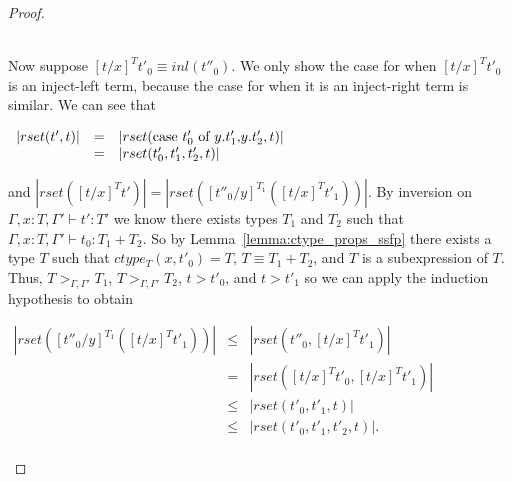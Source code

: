 \begin{proof}
\begin{itemize}
  \ \\
  Now suppose $[t/x]^T t'_0 \equiv inl(t''_0)$.  We only show the case for when $[t/x]^T t'_0$ is an inject-left
  term, because the case for when it is an inject-right term is similar.  We can see that 
  \begin{center}
    \begin{math}
      \begin{array}{lll}
        |rset(t',t)| & = & |rset(\mbox{case}\ t'_0\ \text{of}\ y\text{.}t'_1\text{,}y\text{.}t'_2,t)|\\
        & = & |rset(t'_0,t'_1,t'_2,t)|
      \end{array}
    \end{math}
  \end{center}
  and $|rset([t/x]^T t')| = |rset([t''_0/y]^{T_1} ([t/x]^T t'_1))|$.    By inversion on $\Gamma,x:T,\Gamma' \vdash t':T'$ we know there exists
  types $T_1$ and $T_2$ such that $\Gamma,x:T,\Gamma' \vdash t_0:T_1+T_2$.
  So by Lemma~\ref{lemma:ctype_props_ssfp} there exists a type $T$ such that $ctype_T (x,t'_0) = T$, $T \equiv T_1+T_2$, and $T$ is a 
  subexpression of $T$.  Thus, $T >_{\Gamma,\Gamma'} T_1$, $T >_{\Gamma,\Gamma'} T_2$, $t > t'_0$, and $t > t'_1$ so we can apply the induction hypothesis
  to obtain 
  \begin{center}
    \begin{math}
      \begin{array}{lll}
        |rset([t''_0/y]^{T_1} ([t/x]^T t'_1))| & \leq & |rset(t''_0,[t/x]^T t'_1)|\\
        & =    & |rset([t/x]^T t'_0,[t/x]^T t'_1)|\\
        & \leq & |rset(t'_0, t'_1, t)|\\
        & \leq & |rset(t'_0, t'_1, t'_2, t)|.\\
      \end{array}
    \end{math}
  \end{center}
    

\end{itemize}
\end{proof}
